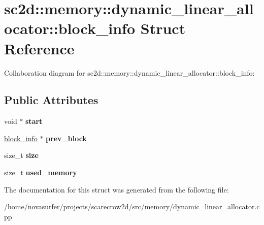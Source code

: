 \hypertarget{structsc2d_1_1memory_1_1dynamic__linear__allocator_1_1block__info}{}\section{sc2d\+:\+:memory\+:\+:dynamic\+\_\+linear\+\_\+allocator\+:\+:block\+\_\+info Struct Reference}
\label{structsc2d_1_1memory_1_1dynamic__linear__allocator_1_1block__info}


Collaboration diagram for sc2d\+:\+:memory\+:\+:dynamic\+\_\+linear\+\_\+allocator\+:\+:block\+\_\+info\+:
\subsection*{Public Attributes}
\begin{DoxyCompactItemize}
\item 
\mbox{\label{structsc2d_1_1memory_1_1dynamic__linear__allocator_1_1block__info_af910eee8415adf5ee87dbcb9ed4d1e94}} 
void $\ast$ {\bfseries start}
\item 
\mbox{\label{structsc2d_1_1memory_1_1dynamic__linear__allocator_1_1block__info_a0dcbe38a5f8af57327962224567e1b93}} 
\hyperlink{structsc2d_1_1memory_1_1dynamic__linear__allocator_1_1block__info}{block\+\_\+info} $\ast$ {\bfseries prev\+\_\+block}
\item 
\mbox{\label{structsc2d_1_1memory_1_1dynamic__linear__allocator_1_1block__info_ae482372f28c227528482dbe392b5de99}} 
size\+\_\+t {\bfseries size}
\item 
\mbox{\label{structsc2d_1_1memory_1_1dynamic__linear__allocator_1_1block__info_aea05cae9b4090bd20ded4a22b406bac7}} 
size\+\_\+t {\bfseries used\+\_\+memory}
\end{DoxyCompactItemize}


The documentation for this struct was generated from the following file\+:\begin{DoxyCompactItemize}
\item 
/home/novasurfer/projects/scarecrow2d/src/memory/dynamic\+\_\+linear\+\_\+allocator.\+cpp\end{DoxyCompactItemize}

